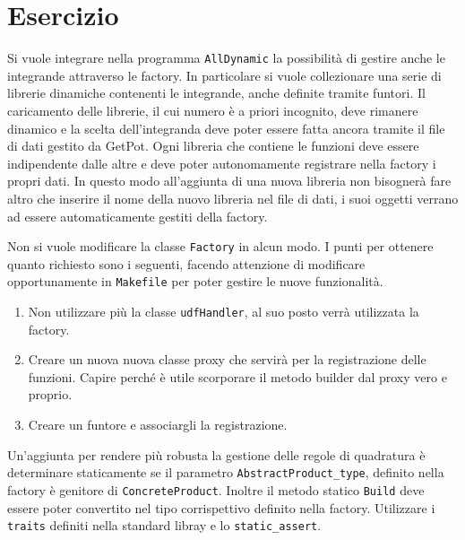 \section*{Esercizio}

Si vuole integrare nella programma \texttt{AllDynamic} la possibilit\`a di
gestire anche le integrande attraverso le factory. In particolare si vuole
collezionare una serie di librerie dinamiche contenenti le integrande, anche
definite tramite funtori. Il caricamento delle librerie, il cui numero \`e a
priori incognito, deve rimanere dinamico e la scelta dell'integranda deve poter
essere fatta ancora tramite il file di dati gestito da GetPot.
Ogni libreria che contiene le funzioni deve essere indipendente dalle altre e
deve poter autonomamente registrare nella factory i propri dati. In questo modo
all'aggiunta di una nuova libreria non bisogner\`a fare altro che inserire il
nome della nuovo libreria nel file di dati, i suoi oggetti verrano ad essere
automaticamente gestiti della factory.

Non si vuole modificare la classe \texttt{Factory} in alcun modo.
I punti per ottenere quanto richiesto sono i seguenti, facendo attenzione di
modificare opportunamente in \texttt{Makefile} per poter gestire le nuove
funzionalit\`a.

\begin{enumerate}

    \item Non utilizzare pi\`u la classe \texttt{udfHandler}, al suo posto
    verr\`a utilizzata la factory.

    \item Creare un nuova nuova classe proxy che servir\`a per la registrazione
    delle funzioni. Capire perch\'e \`e utile scorporare il metodo builder dal proxy
    vero e proprio.

    \item Creare un funtore e associargli la registrazione.

\end{enumerate}

Un'aggiunta per rendere pi\`u robusta la gestione delle regole di quadratura \`e
determinare staticamente se il parametro \texttt{AbstractProduct\_type},
definito nella factory \`e genitore di \texttt{ConcreteProduct}. Inoltre il
metodo statico \texttt{Build} deve essere poter convertito nel tipo
corrispettivo definito nella factory. Utilizzare i \texttt{traits} definiti
nella standard libray e lo \texttt{static\_assert}.
